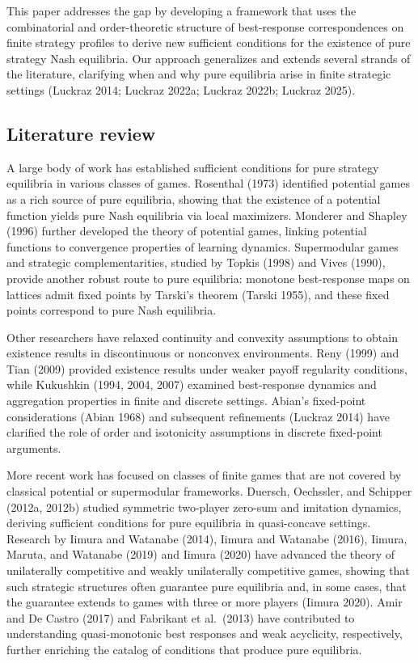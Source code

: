 \documentclass[11pt]{article}
\begin{document}
This paper addresses the gap by developing a framework that uses the combinatorial and order-theoretic structure of best-response correspondences on finite strategy profiles to derive new sufficient conditions for the existence of pure strategy Nash equilibria. Our approach generalizes and extends several strands of the literature, clarifying when and why pure equilibria arise in finite strategic settings (Luckraz 2014; Luckraz 2022a; Luckraz 2022b; Luckraz 2025).

\subsection{Literature review}
A large body of work has established sufficient conditions for pure strategy equilibria in various classes of games. Rosenthal (1973) identified potential games as a rich source of pure equilibria, showing that the existence of a potential function yields pure Nash equilibria via local maximizers. Monderer and Shapley (1996) further developed the theory of potential games, linking potential functions to convergence properties of learning dynamics. Supermodular games and strategic complementarities, studied by Topkis (1998) and Vives (1990), provide another robust route to pure equilibria: monotone best-response maps on lattices admit fixed points by Tarski's theorem (Tarski 1955), and these fixed points correspond to pure Nash equilibria.

Other researchers have relaxed continuity and convexity assumptions to obtain existence results in discontinuous or nonconvex environments. Reny (1999) and Tian (2009) provided existence results under weaker payoff regularity conditions, while Kukushkin (1994, 2004, 2007) examined best-response dynamics and aggregation properties in finite and discrete settings. Abian's fixed-point considerations (Abian 1968) and subsequent refinements (Luckraz 2014) have clarified the role of order and isotonicity assumptions in discrete fixed-point arguments.

More recent work has focused on classes of finite games that are not covered by classical potential or supermodular frameworks. Duersch, Oechssler, and Schipper (2012a, 2012b) studied symmetric two-player zero-sum and imitation dynamics, deriving sufficient conditions for pure equilibria in quasi-concave settings. Research by Iimura and Watanabe (2014), Iimura and Watanabe (2016), Iimura, Maruta, and Watanabe (2019) and Iimura (2020) have advanced the theory of unilaterally competitive and weakly unilaterally competitive games, showing that such strategic structures often guarantee pure equilibria and, in some cases, that the guarantee extends to games with three or more players (Iimura 2020). Amir and De Castro (2017) and Fabrikant et al.\ (2013) have contributed to understanding quasi-monotonic best responses and weak acyclicity, respectively, further enriching the catalog of conditions that produce pure equilibria.
\end{document}
